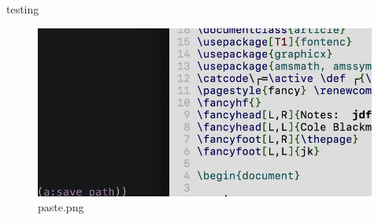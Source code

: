 \documentclass{article}
\begin{document}
testing





\begin{figure}
\includegraphics[width=\linewidth]{paste.png}
\caption{paste.png}
\label{fig:boat1}
\end{figure}
\end{document}
